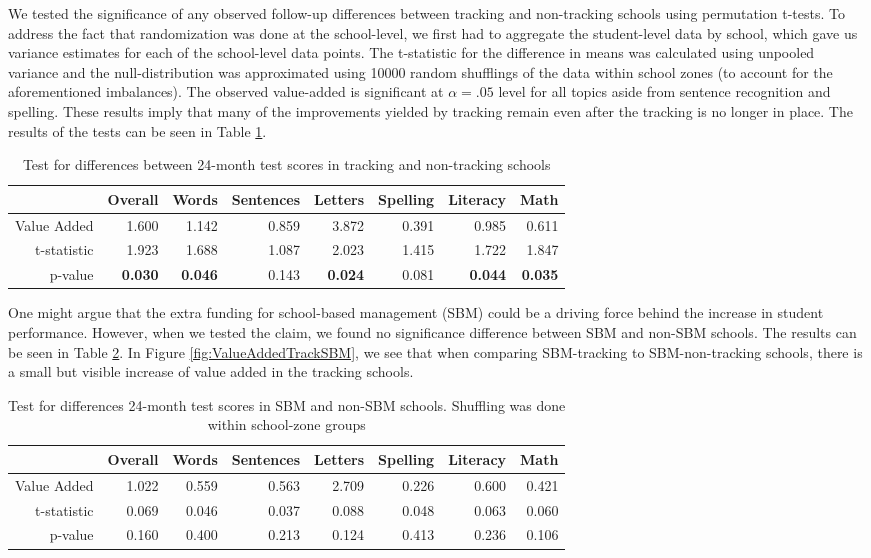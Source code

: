 \documentclass[11pt]{article}
\begin{document}
We tested the significance of any observed follow-up differences between tracking and non-tracking schools using permutation t-tests. To address the fact that randomization was done at the school-level, we first had to aggregate the student-level data by school, which gave us variance estimates for each of the school-level data points.  The t-statistic for the difference in means was calculated using unpooled variance and the null-distribution was approximated using 10000 random shufflings of the data within school zones (to account for the aforementioned imbalances).  The observed value-added is significant at $ \alpha = .05 $ level for all topics aside from sentence recognition and spelling. These results imply that many of the improvements yielded by tracking remain even after the tracking is no longer in place. The results of the tests can be seen in Table \ref{tab:tracking_va}.

\begin{table}[ht]
	\centering
	\begin{tabular}{rrrrrrrr}
		\hline
		& Overall & Words & Sentences & Letters & Spelling & Literacy & Math \\ 
		\hline
		Value Added & 1.600 & 1.142 & 0.859 & 3.872 & 0.391 & 0.985 & 0.611 \\ 
		t-statistic & 1.923 & 1.688 & 1.087 & 2.023 & 1.415 & 1.722 & 1.847 \\ 
		p-value & {\bf 0.030} & {\bf 0.046} & 0.143 & {\bf 0.024} & 0.081 & {\bf 0.044} & {\bf 0.035 }\\ 
		\hline
	\end{tabular}
	\caption{Test for differences between 24-month test scores in tracking and non-tracking schools} 
		\label{tab:tracking_va}
\end{table}

One might argue that the extra funding for school-based management (SBM) could be a driving force behind the increase in student performance.  However, when we tested the claim, we found no significance difference between SBM and non-SBM schools.  The results can be seen in Table \ref{tab:sbm}.  In Figure \ref{fig:ValueAddedTrackSBM}, we see that when comparing SBM-tracking to SBM-non-tracking schools, there is a small but visible increase of value added in the tracking schools.

\begin{table}[ht]
	\centering
	\begin{tabular}{rrrrrrrr}
		\hline
		& Overall & Words & Sentences & Letters & Spelling & Literacy & Math \\ 
		\hline
		Value Added & 1.022 & 0.559 & 0.563 & 2.709 & 0.226 & 0.600 & 0.421 \\ 
		t-statistic & 0.069 & 0.046 & 0.037 & 0.088 & 0.048 & 0.063 & 0.060 \\ 
		p-value & 0.160 & 0.400 & 0.213 & 0.124 & 0.413 & 0.236 & 0.106 \\ 
		\hline
	\end{tabular}
	\caption{Test for differences 24-month test scores in SBM and non-SBM schools.  
		Shuffling was done within school-zone groups} 
	\label{tab:sbm}
\end{table}
\end{document}
